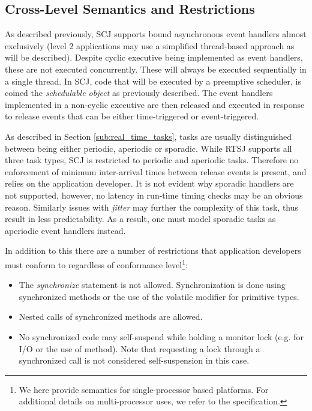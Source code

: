 \subsection{Cross-Level Semantics and Restrictions} %
\label{sub:cross_level_restrictions}
As described previously, SCJ supports bound asynchronous event handlers almost exclusively (level 2 applications may use a simplified thread-based approach as will be described). Despite cyclic executive being implemented as event handlers, these are not executed concurrently. These will always be executed sequentially in a single thread.
In SCJ, code that will be executed by a preemptive scheduler, is coined the \textit{schedulable object} as previously described. The event handlers implemented in a non-cyclic executive are then released and executed in response to release events that can be either time-triggered or event-triggered. 

As described in Section \ref{sub:real_time_tasks}, tasks are usually distinguished between being either periodic, aperiodic or sporadic. While RTSJ supports all three task types, SCJ is restricted to periodic and aperiodic tasks. Therefore no enforcement of minimum inter-arrival times between release events is present, and relies on the application developer. It is not evident why sporadic handlers are not supported, however, no latency in run-time timing checks may be an obvious reason. Similarly issues with \textit{jitter} may further the complexity of this task, thus result in less predictability. As a result, one must model sporadic tasks as aperiodic event handlers instead.

In addition to this there are a number of restrictions that application developers must conform to regardless of conformance level\footnote{We here provide semantics for single-processor based platforms. For additional details on multi-processor uses, we refer to the specification.}:
\begin{itemize}
	\item The \textit{synchronize} statement is not allowed. Synchronization is done using synchronized methods or the use of the volatile modifier for primitive types.
	\item Nested calls of synchronized methods are allowed.
	\item No synchronized code may self-suspend while holding a monitor lock (e.g. for I/O or the use of  method). Note that requesting a lock through a synchronized call is not considered self-suspension in this case.
\end{itemize}

